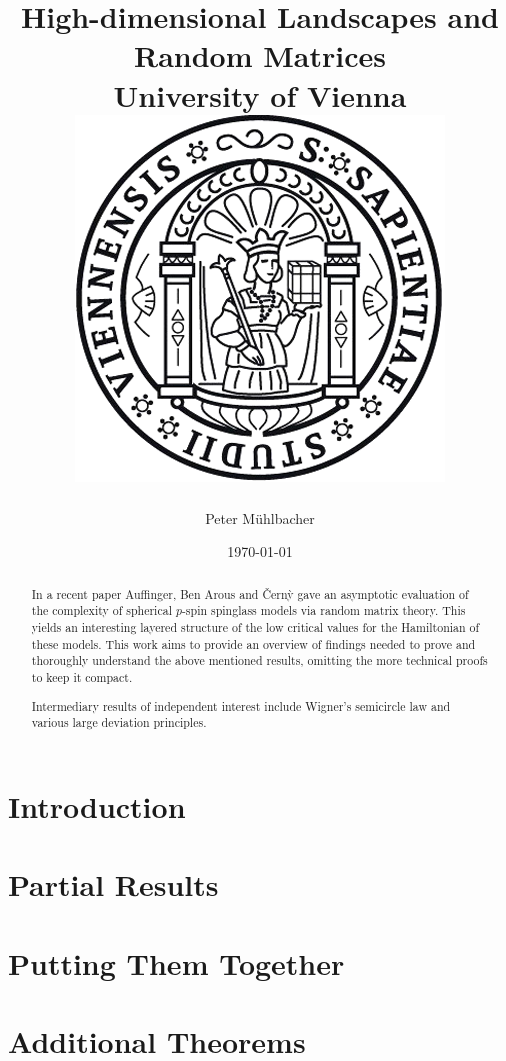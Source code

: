 \documentclass[11pt]{report}
\begin{document}
\title{
	{High-dimensional Landscapes and Random Matrices}\\
	{\large University of Vienna}\\
	{\includegraphics{university.png}}
}
\author{Peter Mühlbacher}
\date{\today}
\maketitle

\begin{abstract}
In a recent paper Auffinger, Ben Arous and {\v{C}}ern{\`y} gave an asymptotic evaluation of the complexity of spherical $p$-spin spinglass models via random matrix theory. This yields an interesting layered structure of the low critical values for the Hamiltonian of these models. This work aims to provide an overview of findings needed to prove and thoroughly understand the above mentioned results, omitting the more technical proofs to keep it compact.

Intermediary results of independent interest include Wigner's semicircle law and various large deviation principles.
\end{abstract}

\tableofcontents

\chapter*{Introduction}


\chapter{Partial Results}\label{chap:prerequisites}


\chapter{Putting Them Together}\label{chap:centralidentities}


\appendix
\chapter{Additional Theorems}




\end{document}

